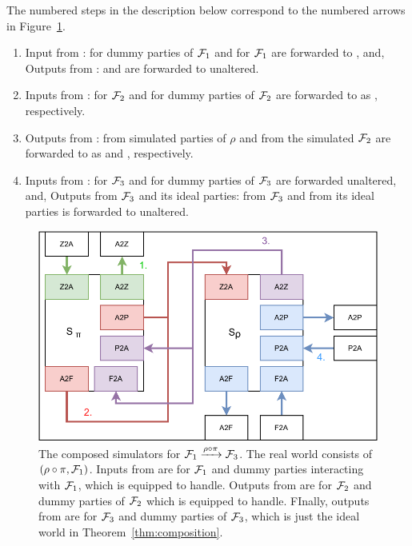 The numbered steps in the description below correspond to the numbered arrows in Figure~\ref{fig:simcomp}.
\begin{enumerate}
\item Input from \Z:  for dummy parties of $\mathcal{F}_1$ and  for $\mathcal{F}_1$  are forwarded to \SIM{\pi}, and, Outputs from \SIM{\pi}:  and  are forwarded to \Z unaltered.
\item Inputs from \SIM{\pi}:  for $\mathcal{F}_2$ and  for dummy parties of $\mathcal{F}_2$ are forwarded to \SIM{\rho} as  , respectively.
\item Outputs from \SIM{\rho}:  from simulated parties of $\rho$  and  from the simulated $\mathcal{F}_2$ are forwarded to \SIM{\pi} as  and , respectively.
\item Inputs from \SIM{\rho}:  for $\mathcal{F}_3$ and  for dummy parties of $\mathcal{F}_3$ are forwarded unaltered, and, Outputs from $\mathcal{F}_3$ and its ideal parties:  from $\mathcal{F}_3$ and  from its ideal parties is forwarded to \SIM{\rho} unaltered.
\end{enumerate}

\begin{figure}
\centering
\includegraphics[scale=0.62]{figures/simcomp.pdf}
\caption{The composed simulators for $\mathcal{F}_1 \xrightarrow{\rho \circ \pi} \mathcal{F}_3$. The real world consists of $(\rho \circ \pi, \mathcal{F}_1)$. Inputs from \Z are for $\mathcal{F}_1$ and dummy parties interacting with $\mathcal{F}_1$, which \SIM{\pi} is equipped to handle. Outputs from \SIM{\pi} are for $\mathcal{F}_2$ and dummy parties of $\mathcal{F}_2$ which \SIM{\rho} is equipped to handle. FInally, outputs from \SIM{\rho} are for $\mathcal{F}_3$ and dummy parties of $\mathcal{F}_3$, which is just the ideal world in Theorem~\ref{thm:composition}.}
\label{fig:simcomp}
\end{figure}

